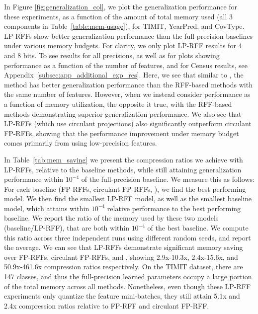 In Figure \ref{fig:generalization_col}, we plot the generalization performance for these experiments, as a function of the amount of total memory used (all 3 components in Table~\ref{table:mem-usage}), for TIMIT, YearPred, and CovType. LP-RFFs show better generalization performance than the full-precision baselines under various memory budgets. For clarity, we only plot LP-RFF results for 4 and 8 bits. To see results for all precisions, as well as for plots showing performance as a function of the number of features, and for Census results, see Appendix~\ref{subsec:app_additional_exp_res}. Here, we see that similar to \citet{nysvsrff12}, the \Nystrom method has better generalization performance than the RFF-based methods with the same number of features. However, when we instead consider performance as a function of memory utilization, the opposite it true, with the RFF-based methods demonstrating superior generalization performance. We also see that LP-RFFs (which use circulant projections) also significantly outperform circulant FP-RFFs, showing that the performance improvement under memory budget comes primarily from using low-precision features.

In Table~\ref{tab:mem_saving} we present the compression ratios we achieve with LP-RFFs, relative to the baseline methods, while still attaining generalization performance within $10^{-4}$ of the full-precision baseline.  We measure this as follows: For each baseline (FP-RFFs, circulant FP-RFFs, \NystromNS), we find the best performing model. We then find the smallest LP-RFF model, as well as the smallest baseline model, which attains within $10^{-4}$ relative performance to the best performing baseline. We report the ratio of the memory used by these two models (baseline/LP-RFF), that are both within $10^{-4}$ of the best baseline. We compute this ratio across three independent runs using different random seeds, and report the average.  We can see that LP-RFFs demonstrate significant memory saving over FP-RFFs, circulant FP-RFFs, and \NystromNS, showing 2.9x-10.3x, 2.4x-15.6x, and 50.9x-461.6x compression ratios respectively. On the TIMIT dataset, there are 147 classes, and thus the full-precision learned parameters occupy a large portion of the total memory across all methods. Nonetheless, even though these LP-RFF experiments only quantize the feature mini-batches, they still attain 5.1x and 2.4x compression ratios relative to FP-RFF and circulant FP-RFF.


